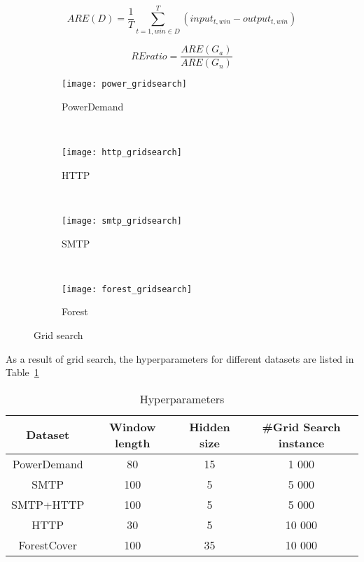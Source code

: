 \begin{equation}\label{eq:are}
ARE(D) = \frac{1}{T}\sum_{t=1,win\in D}^{T}(input_{t,win}-output_{t,win})
\end{equation}

\begin{equation}\label{eq:ratio}
REratio=\frac{ARE(G_a)}{ARE(G_n)}
\end{equation}

\begin{figure}[h]
\centering
	\begin {subfigure}[t]{0.45\textwidth}
	\centering
	\texttt{[image: power\_gridsearch]}
	\caption{PowerDemand}
	\label{fig:power}
	\end{subfigure}
	~
	\begin {subfigure}[t]{0.45\textwidth}
	\centering
	\texttt{[image: http\_gridsearch]}
	\caption{HTTP}
	\label{fig:http}
	\end{subfigure}
	~
	\begin {subfigure}[t]{0.45\textwidth}
	\centering
	\texttt{[image: smtp\_gridsearch]}
	\caption{SMTP}
	\label{fig:smtp}
	\end{subfigure}
	~
	\begin {subfigure}[t]{0.45\textwidth}
	\centering
	\texttt{[image: forest\_gridsearch]}
	\caption{Forest}
	\label{fig:forest}
	\end{subfigure}

	\caption[Grid search]{Grid search}
\label{fig:gridsearch}
\end{figure}

As a result of grid search, the hyperparameters for different datasets are listed in Table~\ref{tab:hyper}

\begin{table}[h] 
\caption{Hyperparameters} 
\centering      
\begin{tabular}{c c c c}  
\hline\hline        
Dataset & Window length & Hidden size & \#Grid Search instance \\ [0.5ex] 
\hline 
PowerDemand & 80 & 15 & 1 000 \\  
SMTP & 100 & 5 &  5 000 \\ 
SMTP+HTTP & 100 & 5 & 5 000 \\ 
HTTP & 30 & 5  &  10 000 \\ 
ForestCover & 100 & 35 & 10 000 \\ [1ex]  
\hline    
\end{tabular}
\label{tab:hyper}  
\end{table} 


